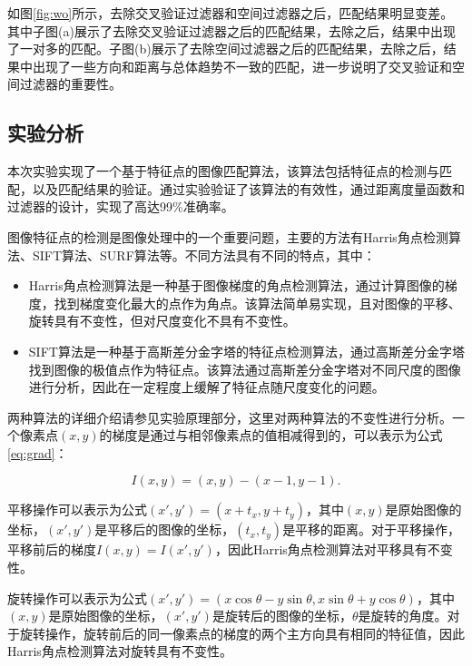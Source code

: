 如图\ref{fig:wo}所示，去除交叉验证过滤器和空间过滤器之后，匹配结果明显变差。其中子图(a)展示了去除交叉验证过滤器之后的匹配结果，去除之后，结果中出现了一对多的匹配。子图(b)展示了去除空间过滤器之后的匹配结果，去除之后，结果中出现了一些方向和距离与总体趋势不一致的匹配，进一步说明了交叉验证和空间过滤器的重要性。

\subsection{实验分析}

本次实验实现了一个基于特征点的图像匹配算法，该算法包括特征点的检测与匹配，以及匹配结果的验证。通过实验验证了该算法的有效性，通过距离度量函数和过滤器的设计，实现了高达99\%准确率。

图像特征点的检测是图像处理中的一个重要问题，主要的方法有Harris角点检测算法、SIFT算法、SURF算法等。不同方法具有不同的特点，其中：

\begin{itemize}
    \item Harris角点检测算法是一种基于图像梯度的角点检测算法，通过计算图像的梯度，找到梯度变化最大的点作为角点。该算法简单易实现，且对图像的平移、旋转具有不变性，但对尺度变化不具有不变性。
    \item SIFT算法是一种基于高斯差分金字塔的特征点检测算法，通过高斯差分金字塔找到图像的极值点作为特征点。该算法通过高斯差分金字塔对不同尺度的图像进行分析，因此在一定程度上缓解了特征点随尺度变化的问题。
\end{itemize}

两种算法的详细介绍请参见实验原理部分，这里对两种算法的不变性进行分析。一个像素点$(x, y)$的梯度是通过与相邻像素点的值相减得到的，可以表示为公式\ref{eq:grad}：

\begin{equation}
    \label{eq:grad}
    I(x, y) = (x, y) - (x - 1, y - 1).
\end{equation}

平移操作可以表示为公式$(x', y')=(x + t_x, y + t_y)$，其中$(x, y)$是原始图像的坐标，$(x', y')$是平移后的图像的坐标，$(t_x, t_y)$是平移的距离。对于平移操作，平移前后的梯度$I(x, y) = I(x', y')$，因此Harris角点检测算法对平移具有不变性。

旋转操作可以表示为公式$(x', y')=(x \cos \theta - y \sin \theta, x \sin \theta + y \cos \theta)$，其中$(x, y)$是原始图像的坐标，$(x', y')$是旋转后的图像的坐标，$\theta$是旋转的角度。对于旋转操作，旋转前后的同一像素点的梯度的两个主方向具有相同的特征值，因此Harris角点检测算法对旋转具有不变性。

